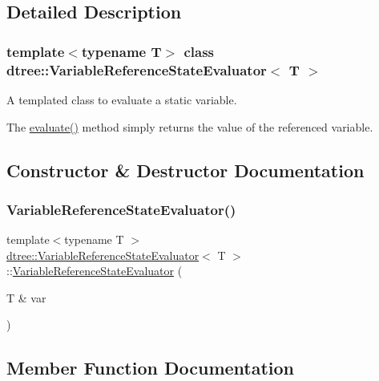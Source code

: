 \subsection{Detailed Description}
\subsubsection*{template$<$typename T$>$\newline
class dtree\+::\+Variable\+Reference\+State\+Evaluator$<$ T $>$}

A templated class to evaluate a static variable. 

The \mbox{\hyperlink{classdtree_1_1_variable_reference_state_evaluator_a94e2383713ab366e325b9c55dd694463}{evaluate()}} method simply returns the value of the referenced variable. 

\subsection{Constructor \& Destructor Documentation}
\mbox{\label{classdtree_1_1_variable_reference_state_evaluator_a6c73b216db648dca939d02cec587a103}} 
\subsubsection{\texorpdfstring{VariableReferenceStateEvaluator()}{VariableReferenceStateEvaluator()}}
{\footnotesize\ttfamily template$<$typename T $>$ \\
\mbox{\hyperlink{classdtree_1_1_variable_reference_state_evaluator}{dtree\+::\+Variable\+Reference\+State\+Evaluator}}$<$ T $>$\+::\mbox{\hyperlink{classdtree_1_1_variable_reference_state_evaluator}{Variable\+Reference\+State\+Evaluator}} (\begin{DoxyParamCaption}\item[{T \&}]{var }\end{DoxyParamCaption})\hspace{0.3cm}{\ttfamily [inline]}}



\subsection{Member Function Documentation}
\mbox{\label{classdtree_1_1_variable_reference_state_evaluator_a94e2383713ab366e325b9c55dd694463}} 
